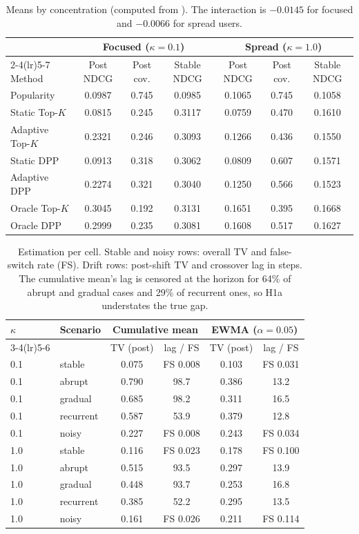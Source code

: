 \documentclass[11pt,a4paper]{article}
\begin{document}
\begin{table}[h]\centering\small
\begin{tabular}{lcccccc}
\toprule
 & \multicolumn{3}{c}{Focused ($\kappa=0.1$)} & \multicolumn{3}{c}{Spread ($\kappa=1.0$)} \\
\cmidrule(lr){2-4}\cmidrule(lr){5-7}
Method & Post NDCG & Post cov. & Stable NDCG & Post NDCG & Post cov. & Stable NDCG \\
\midrule
Popularity & 0.0987 & 0.745 & 0.0985 & 0.1065 & 0.745 & 0.1058 \\
Static Top-$K$ & 0.0815 & 0.245 & 0.3117 & 0.0759 & 0.470 & 0.1610 \\
Adaptive Top-$K$ & 0.2321 & 0.246 & 0.3093 & 0.1266 & 0.436 & 0.1550 \\
Static DPP & 0.0913 & 0.318 & 0.3062 & 0.0809 & 0.607 & 0.1571 \\
Adaptive DPP & 0.2274 & 0.321 & 0.3040 & 0.1250 & 0.566 & 0.1523 \\
Oracle Top-$K$ & 0.3045 & 0.192 & 0.3131 & 0.1651 & 0.395 & 0.1668 \\
Oracle DPP & 0.2999 & 0.235 & 0.3081 & 0.1608 & 0.517 & 0.1627 \\
\bottomrule
\end{tabular}
\caption[Means by concentration (M8)]{Means by concentration (computed from ). The interaction is
$-0.0145$ for focused and $-0.0066$ for spread users.}
\end{table}

\begin{table}[h]\centering\small
\begin{tabular}{llcccc}
\toprule
$\kappa$ & Scenario & \multicolumn{2}{c}{Cumulative mean} & \multicolumn{2}{c}{EWMA ($\alpha=0.05$)} \\
\cmidrule(lr){3-4}\cmidrule(lr){5-6}
 & & TV (post) & lag / FS & TV (post) & lag / FS \\
\midrule
0.1 & stable    & 0.075 & FS 0.008 & 0.103 & FS 0.031 \\
0.1 & abrupt    & 0.790 & 98.7 & 0.386 & 13.2 \\
0.1 & gradual   & 0.685 & 98.2 & 0.311 & 16.5 \\
0.1 & recurrent & 0.587 & 53.9 & 0.379 & 12.8 \\
0.1 & noisy     & 0.227 & FS 0.008 & 0.243 & FS 0.034 \\
1.0 & stable    & 0.116 & FS 0.023 & 0.178 & FS 0.100 \\
1.0 & abrupt    & 0.515 & 93.5 & 0.297 & 13.9 \\
1.0 & gradual   & 0.448 & 93.7 & 0.253 & 16.8 \\
1.0 & recurrent & 0.385 & 52.2 & 0.295 & 13.5 \\
1.0 & noisy     & 0.161 & FS 0.026 & 0.211 & FS 0.114 \\
\bottomrule
\end{tabular}
\caption{Estimation per cell. Stable and noisy rows: overall TV and false-switch rate (FS).
Drift rows: post-shift TV and crossover lag in steps. The cumulative mean's lag is censored at
the horizon for 64\% of abrupt and gradual cases and 29\% of recurrent ones, so H1a
understates the true gap.}
\end{table}
\end{document}
